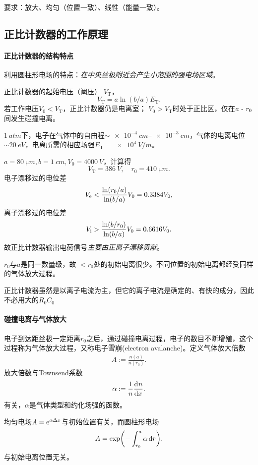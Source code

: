 要求：放大、均匀（位置一致）、线性（能量一致）。

\subsection{正比计数器的工作原理}

\paragraph{正比计数器的结构特点}
利用圆柱形电场的特点：\textit{在中央丝极附近会产生小范围的强电场区域}。

正比计数器的起始电压（阈压） $V_{\mathrm T}$，
\[
	V_{\mathrm T}=a\ln(b/a)E_{\mathrm T}.
\]
若工作电压$V_0<V_\mathrm T$，正比计数器仍是电离室；
$V_0>V_\mathrm T$时处于正比区，仅在$a~\text{-}~ r_0$间发生碰撞电离。
\begin{example}{}{}
	$\SI{1}{atm}$下，电子在气体中的自由程$\sim\SIrange{e-4}{e-3}{cm}$，气体的电离电位$\sim\SI{20}{eV}$，电离所需的相应场强$E_\mathrm T=\SI{e4}{V/m}$。

	$a=\SI{80}{\micro m},b=\SI{1}{cm},V_0=\SI{4000}{V}$，计算得
	\[
		V_\mathrm T=\SI{386}{V},\quad r_0=\SI{410}{\micro m}.
	\]
	电子漂移过的电位差
	\[
		V_\mathrm e<\frac{\ln(r_0/a)}{\ln(b/a)}V_0=0.3384V_0,
	\]
	离子漂移过的电位差
	\[
		V_{\mathrm{i}}>\frac{\ln(b/r_0)}{\ln(b/a)}V_0=0.6616V_0.
	\]
	故正比计数器输出电荷信号\textit{主要由正离子漂移贡献}。
\end{example}
$r_0$与$a$是同一数量级，故%
$<r_0$处的初始电离很少。不同位置的初始电离都经受同样的气体放大过程。%

正比计数器虽然是以离子电流为主，但它的离子电流是确定的、有快的成分，因此不必用大的$R_0C_0$
\paragraph{碰撞电离与气体放大}
电子到达距丝极一定距离$r_0$之后，通过碰撞电离过程，电子的数目不断增殖，这个过程称为气体放大过程，又称电子雪崩(electron avalanche)。定义气体放大倍数
\begin{align}
	A:=\frac{n(a)}{n(r_0)}.
\end{align}
放大倍数与Townsend系数
\[
	\alpha:=\frac1n\frac{\mathrm{d}^{{}}n}{\mathrm{d}{x}^{{}}}.
\]
有关，$\alpha$是气体类型和约化场强的函数。

均匀电场$A=\mathop{}\!\mathrm{e}^{\alpha\Delta x}$与初始位置有关，而圆柱形电场
\[
	A=\exp\biggl(-\int_{r_0}^a\alpha\mathop{}\!\mathrm{d} r\biggr).
\]
与初始电离位置无关。

